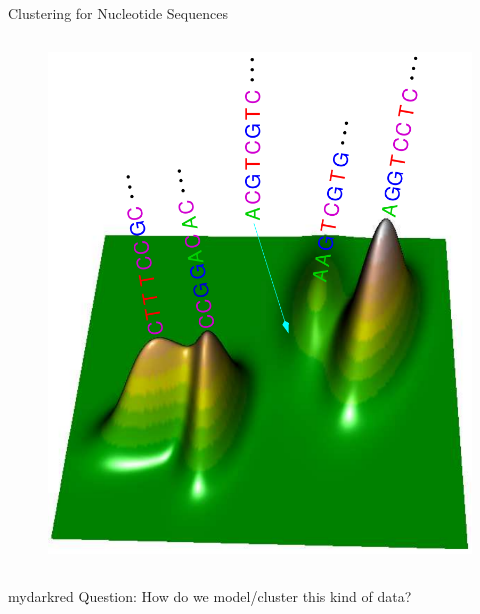 \documentclass{beamer}
\begin{document}
\begin{frame}{Clustering for Nucleotide Sequences}
\begin{columns}
\begin{column}{0.5\textwidth}
\begin{figure}
  \vspace{-1.0cm}
  \includegraphics[width=\textwidth]{./graph/mixmvn_seq}
\end{figure}
\end{column}

\end{columns}

\begin{center}
\begin{color}{mydarkred}
Question: How do we model/cluster this kind of data?
\end{color}
\end{center}

\end{frame}

\end{document}
